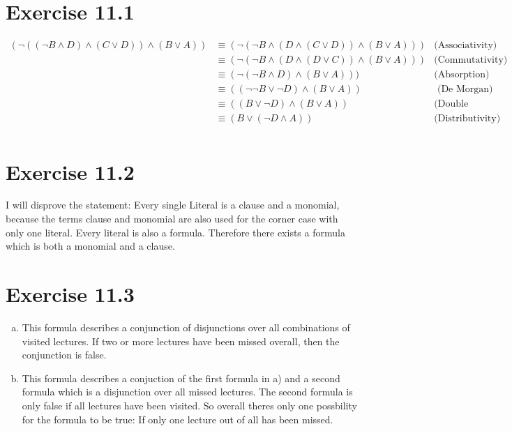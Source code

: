 \documentclass{article} %
\newcommand{\homeworkNumber}{11}
\begin{document}
\section*{Exercise \homeworkNumber.1}
\begin{align*}
	(\neg((\neg B \land D) \land (C \lor D)) \land (B \lor A)) & \equiv (\neg(\neg B \land (D \land (C \lor D)) \land (B \lor A))) & \text{(Associativity)}    \\
	                                                           & \equiv (\neg(\neg B \land (D \land (D \lor C)) \land (B \lor A))) & \text{(Commutativity) }   \\
	                                                           & \equiv (\neg(\neg B \land D) \land (B \lor A)))                   & \text{(Absorption) }      \\
	                                                           & \equiv ((\neg\neg B \lor \neg D) \land (B \lor A))                & \text{ (De Morgan) }      \\
	                                                           & \equiv ((B \lor \neg D) \land (B \lor A))                         & \text{(Double Negation) } \\
	                                                           & \equiv (B \lor ( \neg D \land A))                                 & \text{(Distributivity) }  \\
\end{align*}


\section*{Exercise \homeworkNumber.2}
I will disprove the statement: Every single Literal is a clause and a monomial, because the terms clause and monomial are also used for the corner case with only one literal. Every literal is also a formula. Therefore there exists a formula which is both a monomial and a clause.




\section*{Exercise \homeworkNumber.3}
\begin{enumerate}[(a)]
	\item
	This formula describes a conjunction of disjunctions over all combinations of visited lectures.
	If two or more lectures have been missed overall, then the conjunction is false.
	\item
	This formula describes a conjuction of the first formula in a) and a second formula which is a disjunction over all missed lectures.
	The second formula is only false if all lectures have been visited. So overall theres only one possbility for the formula to be true: If only one lecture out of all has been missed.
\end{enumerate}
\end{document}
